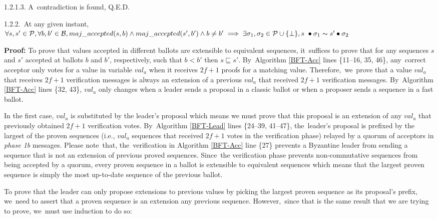 \documentclass[algorithms,article,accept,moreauthors,pdftex,10pt,a4paper]{Definitions/mdpi}
\begin{document}
\indent\indent\indent\indent\indent\indent\indent\parbox{\linewidth}{\strut1.2.1.3. A~contradiction is found, Q.E.D. }\par
\indent\indent\indent\indent\indent\parbox{\linewidth-11mm-\algorithmicindent*5}{\strut1.2.2.~At any given instant, $\forall s,s' \in \mathcal{P},\forall b,b' \in \mathcal{B}, maj\_accepted(s,b) \land maj\_accepted(s',b') \land b \neq b' \implies \exists \sigma_1,\sigma_2 \in \mathcal{P} \cup \{\bot\}, s~\bullet \sigma_1 \thicksim s' \bullet \sigma_2$} 
\indent\indent\indent\indent\indent\indent\parbox{\linewidth-13mm-\algorithmicindent*6}{\strut\textbf{Proof:} To prove that values accepted in different ballots are extensible to equivalent sequences, it~suffices to prove that for any sequences $s$ and $s'$ accepted at ballots $b$ and $b'$, respectively, such that $b < b'$ then $s \sqsubseteq s'$. By~Algorithm \ref{BFT-Acc} lines \{11--16, 35, 46\}, any~correct acceptor only votes for a value in variable $val_a$ when it receives $2f+1$ proofs for a matching value. Therefore,~we~prove that a value $val_a$ that receives $2f+1$ verification messages is always an extension of a previous $val_a$ that received $2f+1$ verification messages. By~Algorithm \ref{BFT-Acc} lines \{32, 43\}, $val_a$ only changes when a leader sends a proposal in a classic ballot or when a proposer sends a sequence in a fast ballot.\strut}
\indent\indent\indent\indent\indent\indent\parbox{\linewidth-13mm-\algorithmicindent*6}{\strut In the first case, $val_a$ is substituted by the leader's proposal which means we must prove that this proposal is an extension of any $val_a$ that previously obtained $2f+1$ verification votes. By~Algorithm \ref{BFT-Lead} lines \{24--39, 41--47\}, the~leader's proposal is prefixed by the largest of the proven sequences (i.e., $val_a$ sequences that received $2f+1$ votes in the verification phase) relayed by a quorum of acceptors in \textit{phase 1b} messages. Please note~that, the~verification in Algorithm \ref{BFT-Acc} line \{27\} prevents a Byzantine leader from sending a sequence that is not an extension of previous proved sequences. Since~the verification phase prevents non-commutative sequences from being accepted by a quorum, every proven sequence in a ballot is extensible to equivalent sequences which means that the largest proven sequence is simply the most up-to-date sequence of the previous ballot. \strut}
\indent\indent\indent\indent\indent\indent\parbox{\linewidth-13mm-\algorithmicindent*6}{\strut To prove that the leader can only propose extensions to previous values by picking the largest proven sequence as its proposal's prefix, we~need to assert that a proven sequence is an extension any previous sequence. However,~since that is the same result that we are trying to prove, we~must use induction to do so:\strut}
\end{document}
